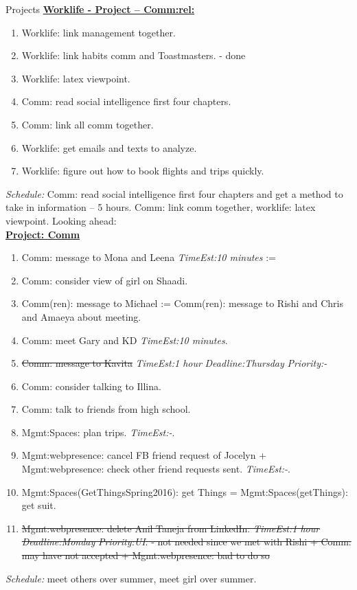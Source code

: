 \documentclass[serif, mathserif, final]{beamer}
\newcommand{\doneTask}[1]{\tiny \item \tiny \sout{#1}}
\newcommand{\te}[1]{\textit{TimeEst:}\textit{#1}}
\newcommand{\dl}[1]{\textit{Deadline:}\textit{#1}}
\newcommand{\pr}[1]{\textit{Priority:}\textit{#1}}
\begin{document}
\begin{frame}
\begin{columns}
\begin{column}{0.5\textwidth}
\begin{block}{Projects}
{\underline{\textbf{Worklife - Project – Comm:rel:}}}
\begin{enumerate} 
\tiny \item \tiny Worklife: link management together.  
\item \tiny Worklife: link habits comm and Toastmasters. - done
\item \tiny Worklife: latex viewpoint. 
\item \tiny Comm: read social intelligence first four chapters.
\item \tiny Comm: link all comm together.
\item \tiny Worklife: get emails and texts to analyze. 
\item \tiny Worklife: figure out how to book flights and trips quickly. 
\end{enumerate}
\textit{Schedule:} Comm: read social intelligence first four chapters
and get a method to take in information – 5 hours. Comm: link comm together, worklife: latex viewpoint. Looking ahead:  \\
{\underline{\textbf{ Project: Comm}}}
\begin{enumerate}
\tiny \item \tiny Comm: message to Mona and Leena \te{10 minutes}  := 
\item \tiny Comm: consider view of girl on Shaadi. 
\item \tiny Comm(ren): message to Michael :=  Comm(ren): message to Rishi and Chris and Amaeya about meeting. 
\item \tiny Comm: meet Gary and KD \te{10 minutes}. 
\doneTask{Comm: message to Kavita} 
\te{1 hour} \dl{Thursday} \pr{-}
      \item \tiny Comm: consider talking to Illina.
      \item \tiny Comm: talk to friends from high school.
      \item \tiny Mgmt:Spaces: plan trips. \te{-}.
      \item \tiny Mgmt:webpresence: cancel FB friend request of
        Jocelyn + Mgmt:webpresence: check other friend requests
        sent. \te{-}.
      \item \tiny Mgmt:Spaces(GetThingsSpring2016): get Things =
        Mgmt:Spaces(getThings): get suit. 
      \doneTask{Mgmt:webpresence: delete Anil Taneja from
        LinkedIn. \te{1 hour} \dl{Monday} \pr{UI}. - not needed since
        we met with Rishi  + Comm: may have not accepted +
        Mgmt:webpresence: bad to do so}
\end{enumerate}
{\it Schedule:} meet others over summer, meet girl over summer.\\


\end{block}
\end{column}
\end{columns}
\end{frame}
\end{document}
